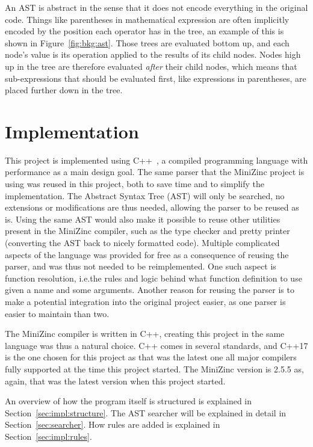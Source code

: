 \documentclass[a4paper,12pt]{article}
\begin{document}
An AST is abstract in the sense that it does not encode everything in the original code.
Things like parentheses in mathematical expression are often implicitly encoded by the
position each operator has in the tree, an example of this is shown in
Figure~\ref{fig:bkg:ast}. Those trees are evaluated bottom up, and each node's value is
its operation applied to the results of its child nodes. Nodes high up in the tree are
therefore evaluated \emph{after} their child nodes, which means that sub-expressions that
should be evaluated first, like expressions in parentheses, are placed further down in the
tree.

\section{Implementation}\label{sec:impl}
This project is implemented using C++~\cite{cpp}, a compiled programming language with
performance as a main design goal. The same parser that the MiniZinc project is
using was reused in this project, both to save time and to simplify the implementation.
The Abstract Syntax Tree (AST) will only be searched, no extensions or
modifications are thus needed, allowing the parser to be reused as is.
Using the same AST would also make it possible to reuse other utilities
present in the MiniZinc compiler, such as the type checker and pretty printer (converting
the AST back to nicely formatted code). Multiple complicated aspects of the language was
provided for free as a consequence of reusing the parser, and was thus not needed to be
reimplemented. One such aspect is function
resolution, i.e.\@ the rules and logic behind what function definition to use given a name
and some arguments. Another reason
for reusing the parser is to make a potential integration into the original project easier,
as one parser is easier to maintain than two.

The MiniZinc
compiler is written in C++, creating this project in the
same language was thus a natural choice. C++ comes in several standards, and C++17 is the one
chosen for this project as that was the latest one all major compilers fully supported at
the time this project started. The MiniZinc version is 2.5.5 as, again, that was the
latest version when this project started.

An overview of how the program itself is structured is explained in
Section~\ref{sec:impl:structure}. The AST searcher will be explained in detail in
Section~\ref{sec:searcher}. How rules are added is explained in Section~\ref{sec:impl:rules}.
\end{document}
